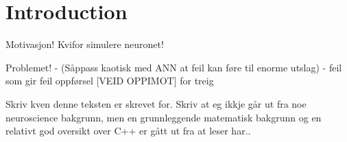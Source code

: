 

\section{Introduction}








Motivasjon! Kvifor simulere neuronet!

Problemet!  - (Såppass kaotisk med ANN at feil kan føre til enorme utslag)
			- feil som gir feil oppførsel [VEID OPPIMOT]  for treig


Skriv kven denne teksten er skrevet for. Skriv at eg ikkje går ut fra noe neuroscience bakgrunn, men en grunnleggende matematisk bakgrunn og en relativt god oversikt over C++ er gått ut fra at leser har..


